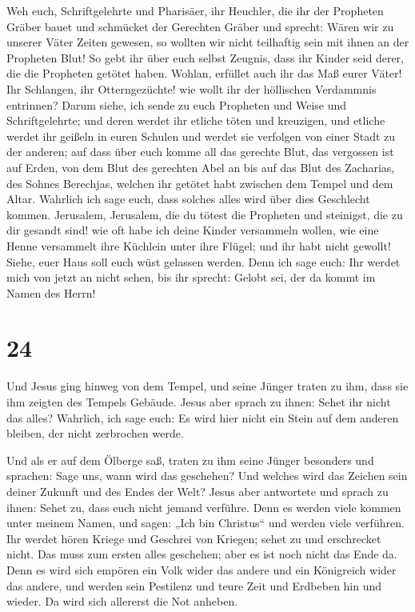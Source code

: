  Weh euch, Schriftgelehrte und Pharisäer, ihr Heuchler,
die ihr der Propheten Gräber bauet und schmücket der Gerechten Gräber
 und sprecht: Wären wir zu unserer Väter Zeiten gewesen,
so wollten wir nicht teilhaftig sein mit ihnen an der Propheten Blut!
 So gebt ihr über euch selbst Zeugnis, dass ihr Kinder
seid derer, die die Propheten getötet haben.  Wohlan,
erfüllet auch ihr das Maß eurer Väter!  Ihr Schlangen,
ihr Otterngezüchte! wie wollt ihr der höllischen Verdammnis entrinnen?
 Darum siehe, ich sende zu euch Propheten und Weise und
Schriftgelehrte; und deren werdet ihr etliche töten und kreuzigen, und
etliche werdet ihr geißeln in euren Schulen und werdet sie verfolgen von
einer Stadt zu der anderen;  auf dass über euch komme all
das gerechte Blut, das vergossen ist auf Erden, von dem Blut des
gerechten Abel an bis auf das Blut des Zacharias, des Sohnes Berechjas,
welchen ihr getötet habt zwischen dem Tempel und dem Altar.
 Wahrlich ich sage euch, dass solches alles wird über
dies Geschlecht kommen.  Jerusalem, Jerusalem, die du
tötest die Propheten und steinigst, die zu dir gesandt sind! wie oft
habe ich deine Kinder versammeln wollen, wie eine Henne versammelt ihre
Küchlein unter ihre Flügel; und ihr habt nicht gewollt! 
Siehe, euer Haus soll euch wüst gelassen werden.  Denn
ich sage euch: Ihr werdet mich von jetzt an nicht sehen, bis ihr
sprecht: Gelobt sei, der da kommt im Namen des Herrn!

\hypertarget{section-23}{%
\section{24}\label{section-23}}

 Und Jesus ging hinweg von dem Tempel, und seine Jünger
traten zu ihm, dass sie ihm zeigten des Tempels Gebäude. 
Jesus aber sprach zu ihnen: Sehet ihr nicht das alles? Wahrlich, ich
sage euch: Es wird hier nicht ein Stein auf dem anderen bleiben, der
nicht zerbrochen werde.

 Und als er auf dem Ölberge saß, traten zu ihm seine
Jünger besonders und sprachen: Sage uns, wann wird das geschehen? Und
welches wird das Zeichen sein deiner Zukunft und des Endes der Welt?
 Jesus aber antwortete und sprach zu ihnen: Sehet zu, dass
euch nicht jemand verführe.  Denn es werden viele kommen
unter meinem Namen, und sagen: „Ich bin Christus`` und werden viele
verführen.  Ihr werdet hören Kriege und Geschrei von
Kriegen; sehet zu und erschrecket nicht. Das muss zum ersten alles
geschehen; aber es ist noch nicht das Ende da.  Denn es
wird sich empören ein Volk wider das andere und ein Königreich wider das
andere, und werden sein Pestilenz und teure Zeit und Erdbeben hin und
wieder.  Da wird sich allererst die Not anheben.

